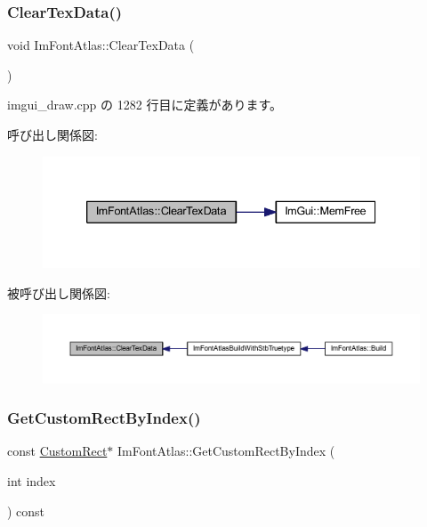 \subsubsection{\texorpdfstring{Clear\+Tex\+Data()}{ClearTexData()}}
{\footnotesize\ttfamily void Im\+Font\+Atlas\+::\+Clear\+Tex\+Data (\begin{DoxyParamCaption}{ }\end{DoxyParamCaption})}



 imgui\+\_\+draw.\+cpp の 1282 行目に定義があります。

呼び出し関係図\+:\nopagebreak
\begin{figure}[H]
\begin{center}
\leavevmode
\includegraphics[width=339pt]{struct_im_font_atlas_a3ede4bd513bec044c77ac392ad9c6e86_cgraph}
\end{center}
\end{figure}
被呼び出し関係図\+:\nopagebreak
\begin{figure}[H]
\begin{center}
\leavevmode
\includegraphics[width=350pt]{struct_im_font_atlas_a3ede4bd513bec044c77ac392ad9c6e86_icgraph}
\end{center}
\end{figure}
\mbox{\label{struct_im_font_atlas_a4d4403e920f1d93307936781050b52ee}} 
\subsubsection{\texorpdfstring{Get\+Custom\+Rect\+By\+Index()}{GetCustomRectByIndex()}}
{\footnotesize\ttfamily const \mbox{\hyperlink{struct_im_font_atlas_1_1_custom_rect}{Custom\+Rect}}$\ast$ Im\+Font\+Atlas\+::\+Get\+Custom\+Rect\+By\+Index (\begin{DoxyParamCaption}\item[{int}]{index }\end{DoxyParamCaption}) const\hspace{0.3cm}{\ttfamily [inline]}}



